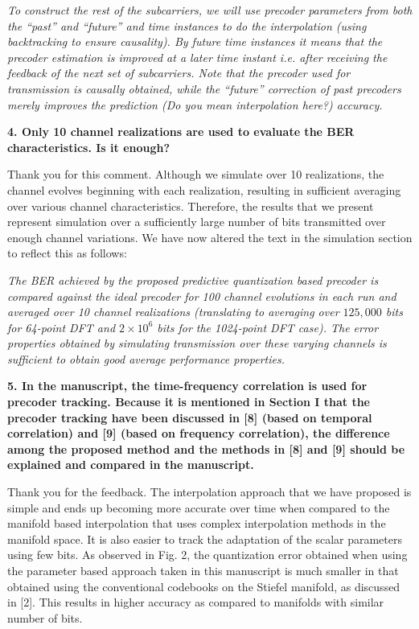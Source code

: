\documentclass[12pt]{letter}
\begin{document}
\emph{To construct the rest of the subcarriers, we will use
precoder parameters from both the ``past'' and ``future'' and time
instances to do the interpolation (using backtracking to ensure
causality). By future time instances it means that the precoder
estimation is improved at a later time instant i.e. after receiving
the feedback of the next set of subcarriers. Note that the precoder
used for transmission is causally obtained, while the ``future''
correction of past precoders merely improves the prediction (Do you mean interpolation here?)
accuracy.}

\textbf{4. Only 10 channel realizations are used to evaluate the BER characteristics. Is it enough?}

Thank you for this comment. Although we simulate over 10 realizations,
the channel evolves beginning with each realization, resulting in
sufficient averaging over various channel characteristics. Therefore,
the results that we present represent simulation over a sufficiently
large number of bits transmitted over enough channel variations. We
have now altered the text in the simulation section to reflect this as
follows:

\emph{The BER achieved by the proposed predictive quantization based
  precoder is compared against the ideal precoder for 100 channel
  evolutions in each run and averaged over 10 channel realizations
  (translating to averaging over $125,000$ bits for 64-point DFT and
  $2\times 10^6$ bits for the 1024-point DFT case). The error
  properties obtained by simulating transmission over these varying
  channels is sufficient to obtain good average performance
  properties.}

\textbf{5. In the manuscript, the time-frequency correlation is used for precoder tracking. Because it is mentioned in Section I that the precoder tracking have been discussed in [8] (based on temporal correlation) and [9] (based on frequency correlation), the difference among the proposed method and the methods in [8] and [9] should be explained and compared in the manuscript.}

Thank you for the feedback. The interpolation approach that we have
proposed is simple and ends up becoming more accurate over time when
compared to the manifold based interpolation that uses complex
interpolation methods in the manifold space. It is also easier to
track the adaptation of the scalar parameters using few bits. As
observed in Fig. 2, the quantization error obtained when using the
parameter based approach taken in this manuscript is much smaller in
that obtained using the conventional codebooks on the Stiefel
manifold, as discussed in [2]. This results in higher accuracy as
compared to manifolds with similar number of bits.
\end{document}
